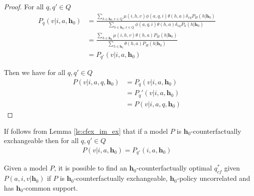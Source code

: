 \begin{proof}
For all $q,q'\in Q$
\begin{align}
    P_q(v|i,a,\mathbf{h}_0) &= \frac{\sum_{h\in \mathbf{h}_0, x\in Q} \mu(i,h,v) \phi(a,q,i) \theta(h,a)\delta_{xq} P_H(h|\mathbf{h}_0)}{\sum_{h\in \mathbf{h}_0, x\in Q} \phi(a,q,i)\theta(h,a)\delta_{xq} P_h(h|\mathbf{h}_0)}\\
                    &= \frac{\sum_{h\in \mathbf{h}_0}\mu(i,h,v)\theta(h,a)P_H(h|\mathbf{h}_0)}{\sum_{h\in \mathbf{h}_0} \theta(h,a) P_H(h|\mathbf{h}_0)}\\
                    &= P_{q'}(v|i,a,\mathbf{h}_0)
\end{align}

Then we have for all $q,q'\in Q$
\begin{align}
    P(v|i,a,q,\mathbf{h}_0) &= P_q(v|i,a,\mathbf{h}_0) \\
                   &= P_q'(v|i,a,\mathbf{h}_0) \\
                   &= P(v|i,a,q,\mathbf{h}_0)
\end{align}
\end{proof}

\begin{corrolary}\label{corr:cfex_pex}
If follows from Lemma \ref{le:cfex_im_ex} that if a model $P$ is $\mathbf{h}_0$-counterfactually exchangeable then for all $q,q'\in Q$
\begin{align}
    P(v|i,a,\mathbf{h}_0) = P_{q'}(i,a,\mathbf{h}_0)
\end{align}
\end{corrolary}



\begin{theorem}

Given a model $P$, it is possible to find an $\mathbf{h}_0$-counterfactually optimal $q^*_{cf}$ given $P(a,i,v|\mathbf{h}_0)$ if $P$ is $\mathbf{h}_0$-counterfactually exchangeable, $\mathbf{h}_0$-policy uncorrelated and has $\mathbf{h}_0$-common support.
\end{theorem}

